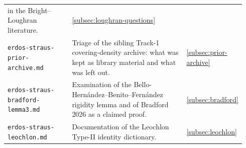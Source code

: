 \documentclass[11pt]{article}
\theoremstyle{plain}
\theoremstyle{definition}
\theoremstyle{remark}
\renewcommand{\_}{\textunderscore\allowbreak}
\begin{document}
\begin{longtable}{@{}p{0.30\linewidth}p{0.58\linewidth}p{0.06\linewidth}@{}}
  in the Bright--Loughran literature. & \ref{subsec:loughran-questions} \\
\texttt{erdos-\allowbreak straus-\allowbreak prior-\allowbreak archive.md} & Triage of the sibling Track-1 covering-density archive: what
  was kept as library material and what was left out. & \ref{subsec:prior-archive} \\
\texttt{erdos-\allowbreak straus-\allowbreak bradford-\allowbreak lemma3.md} & Examination of the Bello-Hern\'andez--Benito--Fern\'andez
  rigidity lemma and of Bradford 2026 as a claimed proof. & \ref{subsec:bradford} \\
\texttt{erdos-\allowbreak straus-\allowbreak leochlon.md} & Documentation of the Leochlon Type-II identity dictionary. & \ref{subsec:leochlon} \\
\bottomrule
\end{longtable}
\endgroup
\end{document}
